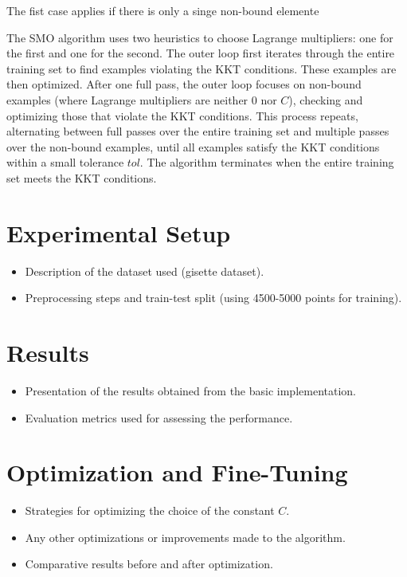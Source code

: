 \documentclass[10pt,a4paper]{article}
\newcounter{para}
\begin{document}
The fist case applies if there is only a singe non-bound elemente 

The SMO algorithm uses two heuristics to choose Lagrange multipliers: one for the first and one for the second. The outer loop first iterates through the entire training set to find examples violating the KKT conditions. These examples are then optimized. After one full pass, the outer loop focuses on non-bound examples (where Lagrange multipliers are neither 0 nor \( C \)), checking and optimizing those that violate the KKT conditions. This process repeats, alternating between full passes over the entire training set and multiple passes over the non-bound examples, until all examples satisfy the KKT conditions within a small tolerance \( tol \). The algorithm terminates when the entire training set meets the KKT conditions.



\section{Experimental Setup}
\label{sec:experiments}
\begin{itemize}
	\item Description of the dataset used (gisette dataset).
	\item Preprocessing steps and train-test split (using 4500-5000 points for training).
\end{itemize}

\section{Results}
\label{sec:results}
\begin{itemize}
	\item Presentation of the results obtained from the basic implementation.
	\item Evaluation metrics used for assessing the performance.
\end{itemize}

\section{Optimization and Fine-Tuning}
\label{sec:optimization}
\begin{itemize}
	\item Strategies for optimizing the choice of the constant \(C\).
	\item Any other optimizations or improvements made to the algorithm.
	\item Comparative results before and after optimization.
\end{itemize}
\end{document}
